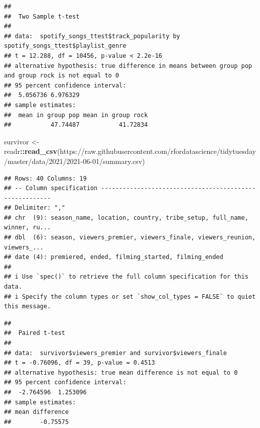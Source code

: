 \documentclass[
  b5paper]{book}
\newenvironment{Shaded}{\begin{snugshade}}{\end{snugshade}}
\newcommand{\AttributeTok}[1]{\textcolor[rgb]{0.13,0.29,0.53}{#1}}
\newcommand{\CommentTok}[1]{\textcolor[rgb]{0.56,0.35,0.01}{\textit{#1}}}
\newcommand{\ConstantTok}[1]{\textcolor[rgb]{0.56,0.35,0.01}{#1}}
\newcommand{\FunctionTok}[1]{\textcolor[rgb]{0.13,0.29,0.53}{\textbf{#1}}}
\newcommand{\NormalTok}[1]{#1}
\newcommand{\OtherTok}[1]{\textcolor[rgb]{0.56,0.35,0.01}{#1}}
\newcommand{\SpecialCharTok}[1]{\textcolor[rgb]{0.81,0.36,0.00}{\textbf{#1}}}
\newcommand{\StringTok}[1]{\textcolor[rgb]{0.31,0.60,0.02}{#1}}
\begin{document}
\begin{verbatim}
## 
##  Two Sample t-test
## 
## data:  spotify_songs_ttest$track_popularity by spotify_songs_ttest$playlist_genre
## t = 12.288, df = 10456, p-value < 2.2e-16
## alternative hypothesis: true difference in means between group pop and group rock is not equal to 0
## 95 percent confidence interval:
##  5.056736 6.976329
## sample estimates:
##  mean in group pop mean in group rock 
##           47.74487           41.72834
\end{verbatim}

\begin{Shaded}
\begin{Highlighting}[]
\NormalTok{survivor }\OtherTok{\textless{}{-}}\NormalTok{ readr}\SpecialCharTok{::}\FunctionTok{read\_csv}\NormalTok{(}\StringTok{\textquotesingle{}https://raw.githubusercontent.com/rfordatascience/tidytuesday/master/data/2021/2021{-}06{-}01/summary.csv\textquotesingle{}}\NormalTok{)}
\end{Highlighting}
\end{Shaded}

\begin{verbatim}
## Rows: 40 Columns: 19
## -- Column specification --------------------------------------------------------
## Delimiter: ","
## chr  (9): season_name, location, country, tribe_setup, full_name, winner, ru...
## dbl  (6): season, viewers_premier, viewers_finale, viewers_reunion, viewers_...
## date (4): premiered, ended, filming_started, filming_ended
## 
## i Use `spec()` to retrieve the full column specification for this data.
## i Specify the column types or set `show_col_types = FALSE` to quiet this message.
\end{verbatim}

\begin{Shaded}
\end{Shaded}

\begin{verbatim}
## 
##  Paired t-test
## 
## data:  survivor$viewers_premier and survivor$viewers_finale
## t = -0.76096, df = 39, p-value = 0.4513
## alternative hypothesis: true mean difference is not equal to 0
## 95 percent confidence interval:
##  -2.764596  1.253096
## sample estimates:
## mean difference 
##        -0.75575
\end{verbatim}
\end{document}
